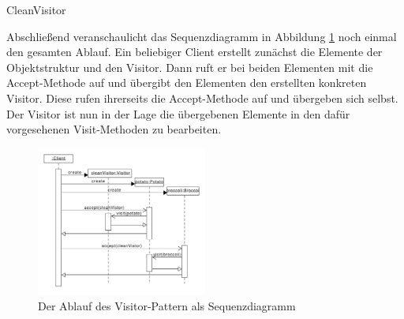 \begin{listing}[h!]
   \centering
   \caption{CleanVisitor}
    \label{visitor_cleanvisitor}
\end{listing}  

Abschließend veranschaulicht das Sequenzdiagramm in Abbildung \ref{visitor_sequenzdiagramm}  noch einmal den gesamten Ablauf. Ein beliebiger Client erstellt zunächst die Elemente der Objektstruktur und den Visitor. Dann ruft er bei beiden Elementen mit die Accept-Methode auf und übergibt den Elementen den erstellten konkreten Visitor. Diese rufen ihrerseits die Accept-Methode auf und übergeben sich selbst. Der Visitor ist nun in der Lage die übergebenen Elemente in den dafür vorgesehenen Visit-Methoden zu bearbeiten.


\begin{figure}[htbp]
\centering
\includegraphics[width=0.5\textwidth]{./paper/visitor/visitor_sequenz}
\caption{Der Ablauf des Visitor-Pattern als Sequenzdiagramm}
\label{visitor_sequenzdiagramm}
\end{figure} 





